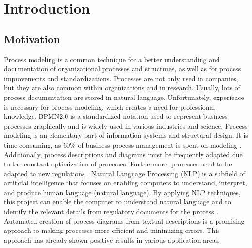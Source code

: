 \chapter{Introduction}
\label{sec:intro}


\section{Motivation}
\label{sec:intro:mo}
Process modeling is a common technique for a better understanding and documentation of organizational processes and structures, as well as for process improvements and standardizations. \cite{leopoldGeneratingNaturalLanguage2012} Processes are not only used in companies, but they are also common within organizations and in research. Usually, lots of process documentation are stored in natural language. \cite{friedrichProcessModelGeneration2011} Unfortunately, experience is necessary for process modeling, which creates a need for professional knowledge. BPMN2.0 is a standardized notation used to represent business processes graphically and is widely used in various industries and science. Process modeling is an elementary part of information systems and structural design. It is time-consuming, as 60\% of business process management is spent on modeling \cite{friedrichProcessModelGeneration2011}. Additionally, process descriptions and diagrams must be frequently adapted due to the constant optimization of processes. Furthermore, processes need to be adapted to new regulations \cite{winterAssessingComplianceBusiness2020}.
Natural Language Processing (NLP) is a subfield of artificial intelligence that focuses on enabling computers to understand, interpret, and produce human language (natural language). By applying NLP techniques, this project can enable the computer to understand natural language and to identify the relevant details from regulatory documents for the process \cite{winterAssessingComplianceBusiness2020}.  
Automated creation of process diagrams from textual descriptions is a promising approach to making processes more efficient and minimizing errors. This approach has already shown positive results in various application areas. 

